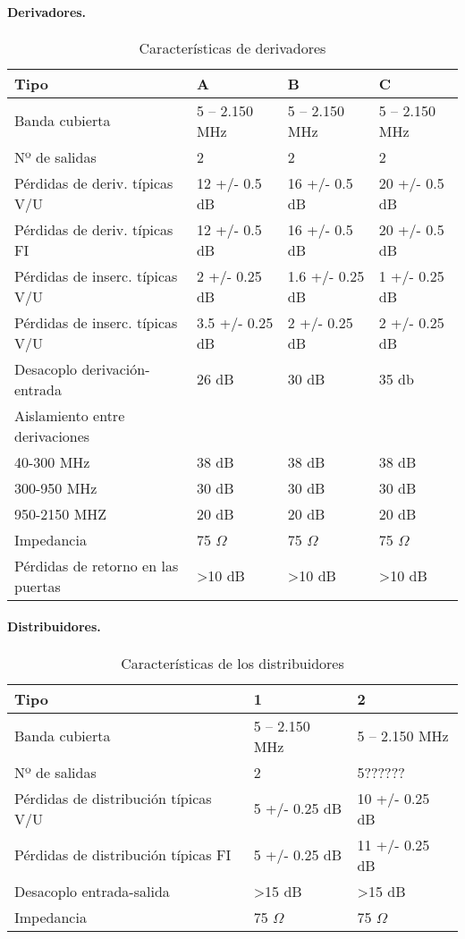 \paragraph{Derivadores.}

\begin{table}[H]
\caption{Características de derivadores}
\centering
\label{derivadores}
\begin{tabular}{l l l l}
    Tipo & A & B & C\\
\hline
\hline
    Banda cubierta  & 5 – 2.150 MHz & 5 – 2.150 MHz & 5 – 2.150 MHz \\
    Nº de salidas & 2 & 2 & 2\\
    Pérdidas de deriv. típicas V/U & 12 +/- 0.5 dB & 16 +/- 0.5 dB & 20 +/- 0.5 dB\\
    Pérdidas de deriv. típicas FI & 12 +/- 0.5 dB & 16 +/- 0.5 dB & 20 +/- 0.5 dB\\
    Pérdidas de inserc. típicas V/U & 2 +/- 0.25 dB & 1.6 +/- 0.25 dB & 1 +/- 0.25 dB\\
    Pérdidas de inserc. típicas V/U & 3.5 +/- 0.25 dB & 2 +/- 0.25 dB & 2 +/- 0.25 dB\\
    Desacoplo derivación-entrada & 26 dB & 30 dB & 35 db\\
    Aislamiento entre derivaciones & & &\\
    40-300 MHz & 38 dB & 38 dB & 38 dB\\
    300-950 MHz & 30 dB & 30 dB & 30 dB\\
    950-2150 MHZ & 20 dB & 20 dB & 20 dB\\
    Impedancia & 75 $\Omega$ & 75 $\Omega$ & 75 $\Omega$\\
    Pérdidas de retorno en las puertas & >10 dB & >10 dB & >10 dB
\end{tabular}
\end{table}

\paragraph{Distribuidores.}

\begin{table}[H]
\caption{Características de los distribuidores}
\centering
\label{distribuidores}
\begin{tabular}{l l l}
    Tipo & 1 & 2\\
\hline
\hline
    Banda cubierta  & 5 – 2.150 MHz & 5 – 2.150 MHz \\
    Nº de salidas & 2 & 5??????\\ 
    Pérdidas de distribución típicas V/U & 5 +/- 0.25 dB & 10 +/- 0.25 dB\\
    Pérdidas de distribución típicas FI & 5 +/- 0.25 dB & 11 +/- 0.25 dB\\
    Desacoplo entrada-salida & >15 dB & >15 dB\\
    Impedancia & 75 $\Omega$ & 75 $\Omega$\\
\end{tabular}
\end{table}

